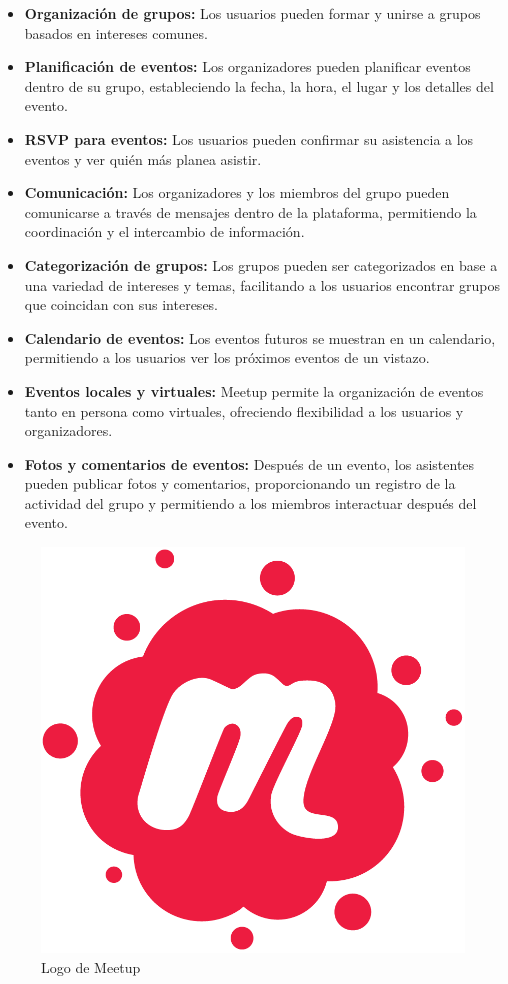 \begin{itemize}
  \item \textbf{Organización de grupos:} Los usuarios pueden formar y unirse a grupos basados en intereses comunes.
  \item \textbf{Planificación de eventos:} Los organizadores pueden planificar eventos dentro de su grupo, estableciendo 
  la fecha, la hora, el lugar y los detalles del evento.
  \item \textbf{RSVP para eventos:} Los usuarios pueden confirmar su asistencia a los eventos y ver quién más planea asistir.
  \item \textbf{Comunicación:} Los organizadores y los miembros del grupo pueden comunicarse a través de mensajes dentro de 
  la plataforma, permitiendo la coordinación y el intercambio de información.
  \item \textbf{Categorización de grupos:} Los grupos pueden ser categorizados en base a una variedad de intereses y 
  temas, facilitando a los usuarios encontrar grupos que coincidan con sus intereses.
  \item \textbf{Calendario de eventos:} Los eventos futuros se muestran en un calendario, permitiendo a los usuarios 
  ver los próximos eventos de un vistazo.
  \item \textbf{Eventos locales y virtuales:} Meetup permite la organización de eventos tanto en persona como virtuales, 
  ofreciendo flexibilidad a los usuarios y organizadores.
  \item \textbf{Fotos y comentarios de eventos:} Después de un evento, los asistentes pueden publicar fotos y 
  comentarios, proporcionando un registro de la actividad del grupo y permitiendo a los miembros interactuar después del evento.
\end{itemize}
\begin{figure}[H]
        \centering
        \includegraphics[width=.5\linewidth]{images/Meetup_Logo.png}
        \caption{Logo de Meetup}
        \label{fig:meetup_logo}
    \end{figure}


